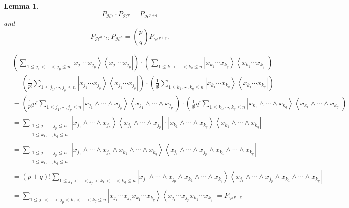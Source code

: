 \documentclass[aps,preprint]{revtex4}%
\newtheorem{lemma}[theorem]{Lemma}
\begin{document}
\begin{lemma}%
\begin{equation}
P_{\mathcal{H}^{q}}\cdot P_{\mathcal{H}^{p}}=P_{\mathcal{H}^{p+q}}%
\end{equation}
and%
\begin{equation}
P_{\mathcal{H}^{q}}\cdot_{G}P_{\mathcal{H}^{p}}=\binom{p}{q}P_{\mathcal{H}%
^{p+q}}.
\end{equation}

\end{lemma}

%

\begin{align}
&  \left(  \sum_{1\leq j_{1}<\cdots<j_{p}\leq n}\left\vert x_{j_{1}}\cdots
x_{j_{p}}\right\rangle \left\langle x_{j_{1}}\cdots x_{j_{p}}\right\vert
\right)  \cdot\left(  \sum_{1\leq k_{1}<\cdots<k_{q}\leq n}\left\vert
x_{k_{1}}\cdots x_{k_{q}}\right\rangle \left\langle x_{k_{1}}\cdots x_{k_{q}%
}\right\vert \right) \\
&  =\left(  \frac{1}{p!}\sum_{1\leq j_{1},\cdots,j_{p}\leq n}\left\vert
x_{j_{1}}\cdots x_{j_{p}}\right\rangle \left\langle x_{j_{1}}\cdots x_{j_{p}%
}\right\vert \right)  \cdot\left(  \frac{1}{q!}\sum_{1\leq k_{1},\cdots
,k_{q}\leq n}\left\vert x_{k_{1}}\cdots x_{k_{q}}\right\rangle \left\langle
x_{k_{1}}\cdots x_{k_{q}}\right\vert \right) \\
&  =\left(  \frac{1}{p!}p!\sum_{1\leq j_{1},\cdots,j_{p}\leq n}\left\vert
x_{j_{1}}\wedge\cdots\wedge x_{j_{p}}\right\rangle \left\langle x_{j_{1}%
}\wedge\cdots\wedge x_{j_{p}}\right\vert \right)  \cdot\left(  \frac{1}%
{q!}q!\sum_{1\leq k_{1},\cdots,k_{q}\leq n}\left\vert x_{k_{1}}\wedge
\cdots\wedge x_{k_{q}}\right\rangle \left\langle x_{k_{1}}\wedge\cdots\wedge
x_{k_{q}}\right\vert \right) \\
&  =\sum_{\substack{1\leq j_{1},\cdots,j_{p}\leq n\\1\leq k_{1},\cdots
,k_{q}\leq n}}\left\vert x_{j_{1}}\wedge\cdots\wedge x_{j_{p}}\right\rangle
\left\langle x_{j_{1}}\wedge\cdots\wedge x_{j_{p}}\right\vert \cdot\left\vert
x_{k_{1}}\wedge\cdots\wedge x_{k_{q}}\right\rangle \left\langle x_{k_{1}%
}\wedge\cdots\wedge x_{k_{q}}\right\vert \\
&  =\sum_{\substack{1\leq j_{1},\cdots,j_{p}\leq n\\1\leq k_{1},\cdots
,k_{q}\leq n}}\left\vert x_{j_{1}}\wedge\cdots\wedge x_{j_{p}}\wedge x_{k_{1}%
}\wedge\cdots\wedge x_{k_{q}}\right\rangle \left\langle x_{j_{1}}\wedge
\cdots\wedge x_{j_{p}}\wedge x_{k_{1}}\wedge\cdots\wedge x_{k_{q}}\right\vert
\\
&  =\left(  p+q\right)  !\sum_{1\leq j_{1}<\cdots<j_{p}<k_{1}<\cdots<k_{q}\leq
n}\left\vert x_{j_{1}}\wedge\cdots\wedge x_{j_{p}}\wedge x_{k_{1}}\wedge
\cdots\wedge x_{k_{q}}\right\rangle \left\langle x_{j_{1}}\wedge\cdots\wedge
x_{j_{p}}\wedge x_{k_{1}}\wedge\cdots\wedge x_{k_{q}}\right\vert \\
&  =\sum_{1\leq j_{1}<\cdots<j_{p}<k_{1}<\cdots<k_{q}\leq n}\left\vert
x_{j_{1}}\cdots x_{j_{p}}x_{k_{1}}\cdots x_{k_{q}}\right\rangle \left\langle
x_{j_{1}}\cdots x_{j_{p}}x_{k_{1}}\cdots x_{k_{q}}\right\vert =P_{\mathcal{H}%
^{p+q}}%
\end{align}
\end{document}
